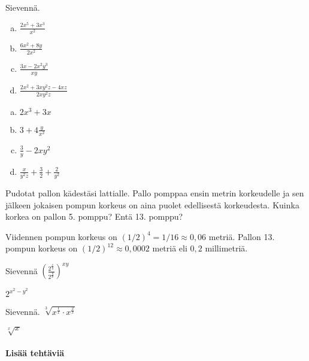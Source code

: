 \begin{tehtavasivu}
\begin{tehtava}
Sievennä.
	\begin{enumerate}[a)]
	\item $\frac{2x^5+3x^3}{x^2}$
	\item $\frac{6x^2+8y}{2x^2}$
	\item $\frac{3x-2x^2y^3}{xy}$
	\item $\frac{2x^2+3xy^2z-4xz}{2xy^2z}$
	\end{enumerate}

\begin{vastaus}
	\begin{enumerate}[a)]
	\item $2x^3+3x$
	\item $3+4 \frac{y}{x^2}$
	\item $\frac{3}{y} - 2xy^2$
	\item $\frac{x}{y^2z} + \frac{3}{2} + \frac{2}{y^2}$
	\end{enumerate}
\end{vastaus}
\end{tehtava}

\begin{tehtava}
        Pudotat pallon kädestäsi lattialle. Pallo pomppaa ensin metrin korkeudelle ja sen jälkeen jokaisen pompun korkeus on aina puolet edellisestä korkeudesta. Kuinka korkea on pallon 5. pomppu? Entä 13. pomppu?     
        \begin{vastaus}
        Viidennen pompun korkeus on $(1/2)^4=1/16 \approx 0,06$ metriä. Pallon 13. pompun korkeus on $(1/2)^{12} \approx 0{,}0002$ metriä eli $0,2$ millimetriä.
        \end{vastaus}
\end{tehtava}

\begin{tehtava}
Sievennä
$( \frac{2^{\frac{x}{y}}}{2^{\frac{y}{x}}} )^{xy}$
\begin{vastaus}
 $2^{x^2 - y^2}$
\end{vastaus}


\end{tehtava}

\begin{tehtava}
Sievennä.
$\sqrt[3]{ x^{\frac{1}{x}} \cdot x^{\frac{2}{x}} }$
 \begin{vastaus}
  $\sqrt[x]{x}$
 \end{vastaus}
\end{tehtava}
 
\paragraph*{Lisää tehtäviä}


\end{tehtavasivu}
